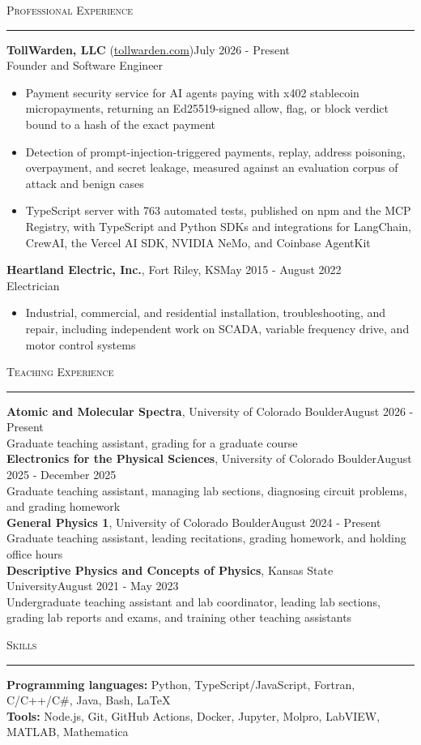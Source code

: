 \documentclass{article}
\newcommand{\return}{\\[6pt]}
\newcommand{\sect}[1]{
\needspace{4\baselineskip}\noindent\large{\textsc{#1}}\\[-6pt]\normalsize{\noindent\rule{\textwidth}{0.5pt}}
}
\begin{document}
\sect{Professional Experience}
\textbf{TollWarden, LLC} (\href{https://tollwarden.com}{tollwarden.com})\hfill July 2026 - Present\\
Founder and Software Engineer\begin{itemize}
	\item Payment security service for AI agents paying with x402 stablecoin micropayments, returning an Ed25519-signed allow, flag, or block verdict bound to a hash of the exact payment
	\item Detection of prompt-injection-triggered payments, replay, address poisoning, overpayment, and secret leakage, measured against an evaluation corpus of attack and benign cases
	\item TypeScript server with 763 automated tests, published on npm and the MCP Registry, with TypeScript and Python SDKs and integrations for LangChain, CrewAI, the Vercel AI SDK, NVIDIA NeMo, and Coinbase AgentKit
\end{itemize}
\textbf{Heartland Electric, Inc.}, Fort Riley, KS\hfill May 2015 - August 2022\\
Electrician\begin{itemize}
	\item Industrial, commercial, and residential installation, troubleshooting, and repair, including independent work on SCADA, variable frequency drive, and motor control systems
\end{itemize}
\sect{Teaching Experience}
\textbf{Atomic and Molecular Spectra}, University of Colorado Boulder\hfill August 2026 - Present\\
Graduate teaching assistant, grading for a graduate course\return
\textbf{Electronics for the Physical Sciences}, University of Colorado Boulder\hfill August 2025 - December 2025\\
Graduate teaching assistant, managing lab sections, diagnosing circuit problems, and grading homework \return
\textbf{General Physics 1}, University of Colorado Boulder\hfill August 2024 - Present\\
Graduate teaching assistant, leading recitations, grading homework, and holding office hours\return
\textbf{Descriptive Physics and Concepts of Physics}, Kansas State University\hfill August 2021 - May 2023\\
Undergraduate teaching assistant and lab coordinator, leading lab sections, grading lab reports and exams, and training other teaching assistants\par\vspace{6pt}
\sect{Skills}
\textbf{Programming languages:} Python, TypeScript/JavaScript, Fortran, C/C++/C\#, Java, Bash, \LaTeX \return
\textbf{Tools:} Node.js, Git, GitHub Actions, Docker, Jupyter, Molpro, LabVIEW, MATLAB, Mathematica
\end{document}
